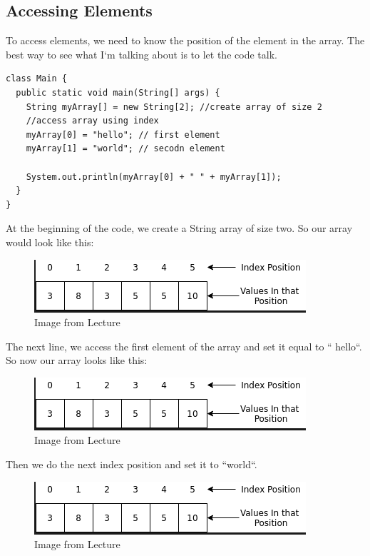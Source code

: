 \documentclass[11]{article}
\begin{document}
\subsection{Accessing Elements}
To access elements, we need to know the position of the element in the array. The best way to see what I`m talking about is to let the code talk.

\begin{lstlisting}
class Main {
  public static void main(String[] args) {
    String myArray[] = new String[2]; //create array of size 2
    //access array using index
    myArray[0] = "hello"; // first element
    myArray[1] = "world"; // secodn element

    System.out.println(myArray[0] + " " + myArray[1]);
  }
}
\end{lstlisting}

At the beginning of the code, we create a String array of size two. So our array would look like this:
\begin{figure}[H]
	\centering
	\includegraphics[scale=0.5]{arrays1.png}
	\caption{Image from Lecture}
\end{figure}

The next line, we access the first element of the array and set it equal to `` hello``. So now our array looks like this:

\begin{figure}[H]
	\centering
	\includegraphics[scale=0.5]{arrays1.png}
	\caption{Image from Lecture}
\end{figure}

Then we do the next index position and set it to ``world``. 

\begin{figure}[H]
	\centering
	\includegraphics[scale=0.5]{arrays1.png}
	\caption{Image from Lecture}
\end{figure}
\end{document}
